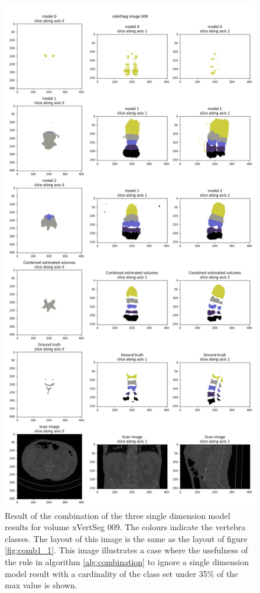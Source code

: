 \begin{figure}
    \centering
    \includegraphics[width=.95\textwidth]{images/comb1_denoise2_erode1_xVertSeg_009.png}
    \caption{
        Result of the combination of the three single dimension model results for volume xVertSeg 009.
        The colours indicate the vertebra classes. The layout of this image is the same as the layout of figure \ref{fig:comb1_1}.
        This image illustrates a case where the usefulness of the rule in algorithm \ref{alg:combination}  to ignore a single dimension model result with a cardinality 
        of the class set under 35\% of the max value is shown.\label{fig:comb1_2}
    }
\end{figure}

